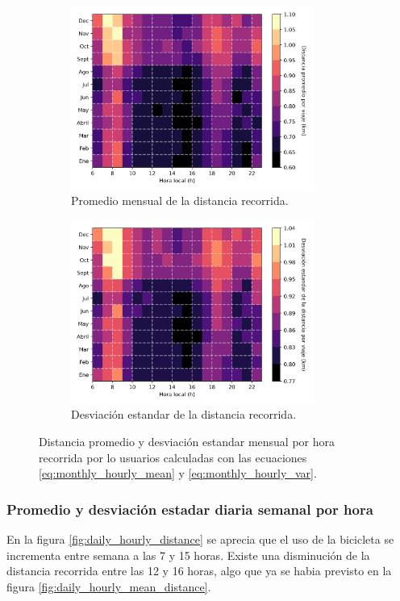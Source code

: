 \begin{figure}[H]
    \centering
    \begin{subfigure}[b]{8cm}
        \includegraphics[width=8cm]{Graphics/monthly_hourly_mean_distance.png}
        \caption{Promedio mensual de la distancia recorrida.}
        \label{fig:monthly_hourly_mean_distance}
    \end{subfigure}
    \begin{subfigure}[b]{8.5cm}
        \includegraphics[width=8cm]{Graphics/monthly_hourly_var_distance.png}
        \caption{Desviación estandar de la distancia recorrida.}
        \label{fig:monthly_hourly_var_distance}
    \end{subfigure}
    \caption{Distancia promedio y desviación estandar mensual por hora recorrida por lo usuarios calculadas con las ecuaciones \ref{eq:monthly_hourly_mean} y \ref{eq:monthly_hourly_var}.}
    \label{fig:monthly_hourly_distance}
\end{figure}

\subsubsection{Promedio y desviación estadar diaria semanal por hora}

En la figura \ref{fig:daily_hourly_distance} se aprecia que el uso de la bicicleta se incrementa entre semana a las 7 y 15 horas. Existe una disminución de la distancia recorrida entre las 12 y 16 horas, algo que ya se habia previsto en la figura \ref{fig:daily_hourly_mean_distance}.

